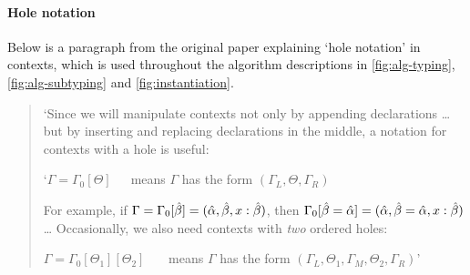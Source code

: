 \paragraph{Hole notation}
Below is a paragraph from the original paper \cite{completebidir} explaining `hole notation' in contexts, which is used throughout the algorithm descriptions in \ref{fig:alg-typing}, \ref{fig:alg-subtyping} and \ref{fig:instantiation}. 
\begin{quote}
`Since we will manipulate contexts not only by appending declarations \dots but by inserting and replacing declarations in the middle, a notation for contexts with a hole is useful:
\vspace{-4pt}
\begin{displ}
  `$\Gamma = \Gamma_0[\Theta]$~~~means $\Gamma$ has the form $(\Gamma_L, \Theta, \Gamma_R)$
\end{displ}
For example, if $\Gamma = \Gamma_0[\hat{\beta}] = (\hat{\alpha}, \hat{\beta}, x : \hat{\beta})$,
then $\Gamma_0[{\hat{\beta}} = {\hat{\alpha}}] = (\hat{\alpha}, {\hat{\beta}} = {\hat{\alpha}}, x : \hat{\beta})$
\newline\dots\newline
{}
Occasionally, we also need contexts with \emph{two} ordered holes:
\begin{displ}
  $\Gamma = \Gamma_0[\Theta_1][\Theta_2]$
  ~~~means
  $\Gamma$ has the form $(\Gamma_L, \Theta_1, \Gamma_M, \Theta_2, \Gamma_R)$' \cite{completebidir}
\end{displ}
\end{quote}

\pagebreak


